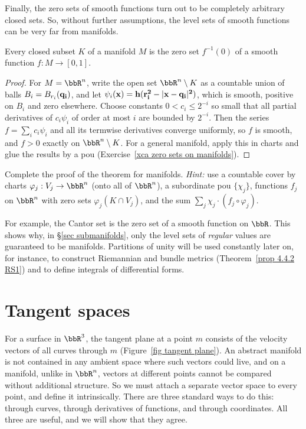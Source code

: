 Finally, the zero sets of smooth functions turn out to be completely arbitrary closed sets. So, without further assumptions, the level sets of smooth functions can be very far from manifolds.

\begin{thm}\label{thm closed sets are zero sets}
    Every closed subset $K$ of a manifold $M$ is the zero set $f^{-1}(0)$ of a smooth function $f:M\to[0,1]$.
\end{thm}
\begin{proof}
    For $M=\bbR^n$, write the open set $\bbR^n\setminus K$ as a countable union of balls $B_i=B_{r_i}(\bf{q}_i)$, and let $\psi_i(\bf{x})=h(r_i^2-\lvert\bf{x}-\bf{q}_i\rvert^2)$, which is smooth, positive on $B_i$ and zero elsewhere. Choose constants $0<c_i\leq2^{-i}$ so small that all partial derivatives of $c_i\psi_i$ of order at most $i$ are bounded by $2^{-i}$. Then the series $f=\sum_ic_i\psi_i$ and all its termwise derivatives converge uniformly, so $f$ is smooth, and $f>0$ exactly on $\bbR^n\setminus K$. For a general manifold, apply this in charts and glue the results by a \gls{pou} (Exercise~\ref{xca zero sets on manifolds}).
\end{proof}

\begin{xca}\label{xca zero sets on manifolds}
    Complete the proof of the theorem for manifolds. \emph{Hint:} use a countable cover by charts $\varphi_j:V_j\to\bbR^n$ (onto all of $\bbR^n$), a subordinate \gls{pou} $\{\chi_j\}$, functions $f_j$ on $\bbR^n$ with zero sets $\varphi_j(K\cap V_j)$, and the sum $\sum_j\chi_j\cdot(f_j\circ\varphi_j)$.
\end{xca}

For example, the Cantor set is the zero set of a smooth function on $\bbR$. This shows why, in \S\ref{sec submanifolds}, only the level sets of \emph{regular} values are guaranteed to be manifolds. Partitions of unity will be used constantly later on, for instance, to construct Riemannian and bundle metrics (Theorem~\ref{prop 4.4.2 RS1}) and to define integrals of differential forms.


\section{Tangent spaces}\label{sec tangent spaces}

For a surface in $\bbR^3$, the tangent plane at a point $m$ consists of the velocity vectors of all curves through $m$ (Figure~\ref{fig tangent plane}). An abstract manifold is not contained in any ambient space where such vectors could live, and on a manifold, unlike in $\bbR^n$, vectors at different points cannot be compared without additional structure. So we must attach a separate vector space to every point, and define it intrinsically. There are three standard ways to do this: through curves, through derivatives of functions, and through coordinates. All three are useful, and we will show that they agree.

